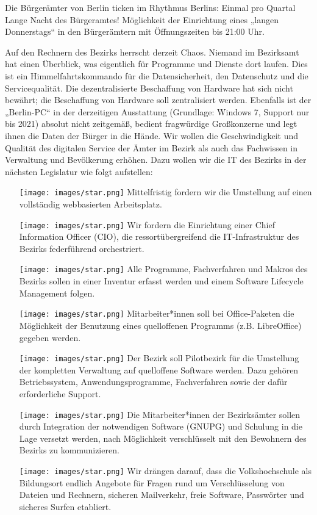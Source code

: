 \documentclass[a4paper,10pt]{article}
\begin{document}
Die Bürgerämter von Berlin ticken im Rhythmus Berlins: Einmal pro
Quartal Lange Nacht des Bürgeramtes! Möglichkeit der Einrichtung eines
„langen Donnerstags`` in den Bürgerämtern mit Öffnungszeiten bis 21:00
Uhr.

Auf den Rechnern des Bezirks herrscht derzeit Chaos. Niemand im
Bezirksamt hat einen Überblick, was eigentlich für Programme und Dienste
dort laufen. Dies ist ein Himmelfahrtskommando für die Datensicherheit,
den Datenschutz und die Servicequalität. Die dezentralisierte
Beschaffung von Hardware hat sich nicht bewährt; die Beschaffung von
Hardware soll zentralisiert werden. Ebenfalls ist der „Berlin-PC`` in
der derzeitigen Ausstattung (Grundlage: Windows 7, Support nur bis 2021)
absolut nicht zeitgemäß, bedient fragwürdige Großkonzerne und legt ihnen
die Daten der Bürger in die Hände. Wir wollen die Geschwindigkeit und
Qualität des digitalen Service der Ämter im Bezirk als auch das
Fachwissen in Verwaltung und Bevölkerung erhöhen. Dazu wollen wir die IT
des Bezirks in der nächsten Legislatur wie folgt aufstellen:

\begin{itemize}
\itemsep1pt\parskip0pt
\item[\texttt{[image: images/star.png]}]
  Mittelfristig fordern wir die Umstellung auf einen vollständig
  webbasierten Arbeitsplatz.
\item[\texttt{[image: images/star.png]}]
  Wir fordern die Einrichtung einer Chief Information Officer (CIO), die
  ressortübergreifend die IT-Infrastruktur des Bezirks federführend
  orchestriert.
\item[\texttt{[image: images/star.png]}]
  Alle Programme, Fachverfahren und Makros des Bezirks sollen in einer
  Inventur erfasst werden und einem Software Lifecycle Management
  folgen.
\item[\texttt{[image: images/star.png]}]
  Mitarbeiter*innen soll bei Office-Paketen die Möglichkeit der
  Benutzung eines quelloffenen Programms (z.B. LibreOffice) gegeben
  werden.
\item[\texttt{[image: images/star.png]}]
  Der Bezirk soll Pilotbezirk für die Umstellung der kompletten
  Verwaltung auf quelloffene Software werden. Dazu gehören
  Betriebssystem, Anwendungsprogramme, Fachverfahren sowie der dafür
  erforderliche Support.
\item[\texttt{[image: images/star.png]}]
  Die Mitarbeiter*innen der Bezirksämter sollen durch Integration der
  notwendigen Software (GNUPG) und Schulung in die Lage versetzt werden,
  nach Möglichkeit verschlüsselt mit den Bewohnern des Bezirks zu
  kommunizieren.
\item[\texttt{[image: images/star.png]}]
  Wir drängen darauf, dass die Volkshochschule als Bildungsort endlich
  Angebote für Fragen rund um Verschlüsselung von Dateien und Rechnern,
  sicheren Mailverkehr, freie Software, Passwörter und sicheres Surfen
  etabliert.
\end{itemize}
\end{document}
